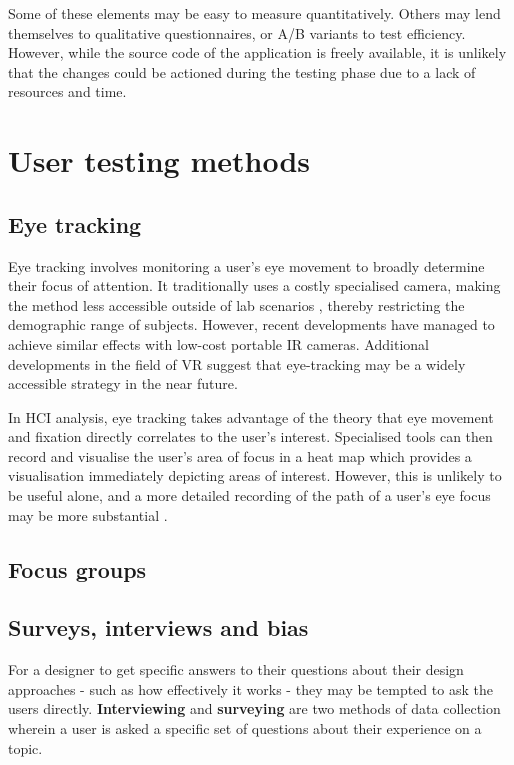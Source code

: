 \documentclass{scrartcl}
\begin{document}
Some of these elements may be easy to measure quantitatively. Others may lend themselves to qualitative questionnaires, or A/B variants to test efficiency. However, while the source code of the application is freely available, it is unlikely that the changes could be actioned during the testing phase due to a lack of resources and time.

\section{User testing methods}
\subsection{Eye tracking}
Eye tracking involves monitoring a user's eye movement to broadly determine their focus of attention. \cite{poole_eye_2006} It traditionally uses a costly specialised camera, making the method less accessible outside of lab scenarios \cite{devicecomparison}, thereby restricting the demographic range of subjects. However, recent developments \cite{lowcosttracker} \cite{ho_low_2014} have managed to achieve similar effects with low-cost portable IR cameras. Additional developments in the field of VR suggest that eye-tracking may be a widely accessible strategy in the near future.

In HCI analysis, eye tracking takes advantage of the theory that eye movement and fixation directly correlates to the user's interest. \cite{poole_eye_2006} Specialised tools can then record and visualise the user's area of focus in a heat map which provides a visualisation immediately depicting areas of interest. However, this is unlikely to be useful alone, and a more detailed recording of the path of a user's eye focus may be more substantial \cite{gazepatterns}.

\subsection{Focus groups}


\subsection{Surveys, interviews and bias}
For a designer to get specific answers to their questions about their design approaches - such as how effectively it works - they may be tempted to ask the users directly. \textbf{Interviewing} and \textbf{surveying} are two methods of data collection wherein a user is asked a specific set of questions about their experience on a topic.
\end{document}
